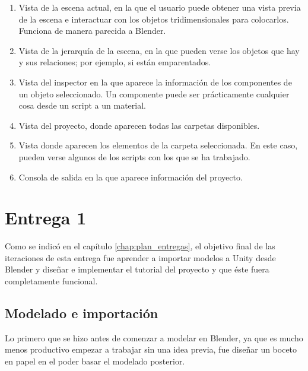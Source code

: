 \begin{enumerate}
    \item Vista de la escena actual, en la que el usuario puede obtener una vista previa de la escena e interactuar con los objetos tridimensionales para colocarlos. Funciona de manera parecida a Blender.
    
    \item Vista de la jerarquía de la escena, en la que pueden verse los objetos que hay y sus relaciones; por ejemplo, si están emparentados.
    
    \item Vista del inspector en la que aparece la información de los componentes de un objeto seleccionado. Un componente puede ser prácticamente cualquier cosa desde un script a un material.
    
    \item Vista del proyecto, donde aparecen todas las carpetas disponibles.
    
    \item Vista donde aparecen los elementos de la carpeta seleccionada. En este caso, pueden verse algunos de los scripts con los que se ha trabajado.
    
    \item Consola de salida en la que aparece información del proyecto.
\end{enumerate}

\section{Entrega 1}

Como se indicó en el capítulo \ref{chap:plan_entregas}, el objetivo final de las iteraciones de esta entrega fue aprender a importar modelos a Unity desde Blender y diseñar e implementar el tutorial del proyecto y que éste fuera completamente funcional. 

\subsection{Modelado e importación}

Lo primero que se hizo antes de comenzar a modelar en Blender, ya que es mucho menos productivo empezar a trabajar sin una idea previa, fue diseñar un boceto en papel en el poder basar el modelado posterior.

